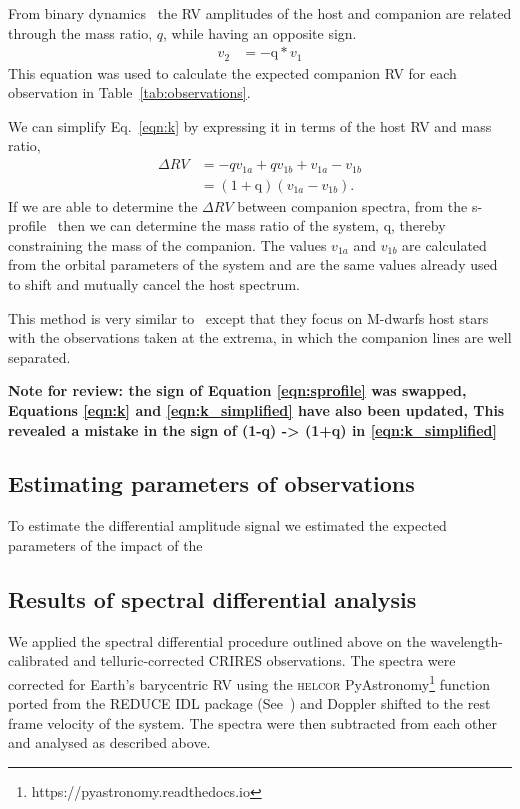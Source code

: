 \documentclass[fleqn,usenatbib]{mnras}
\begin{document}
    From binary dynamics~\citep[e.g.][]{murray_keplerian_2010} the RV amplitudes of the host and companion are related through the mass ratio, \(q\), while having an opposite sign.
    \begin{align}
    v_{2}  &= -\textrm{q} * v_{1} \label{eqn:q_relation}
    \end{align}
    This equation was used to calculate the expected companion RV for each observation in Table~\ref{tab:observations}.

    We can simplify Eq.~\ref{eqn:k} by expressing it in terms of the host RV and mass ratio,
    \begin{align}
    \Delta RV &= -q v_{1a} + q v_{1b} + v_{1a} - v_{1b} \nonumber \\
    &= (1 + \textrm{q})(v_{1a} - v_{1b}). \label{eqn:k_simplified}
    \end{align}
    If we are able to determine the \(\Delta RV\) between companion spectra,  from the s-profile~\citep[see ][]{ferluga_separating_1997} then we can determine the mass ratio of the system, q, thereby constraining the mass of the companion. The values \(v_{1a}\) and \(v_{1b}\) are calculated from the orbital parameters of the system and are the same values already used to shift and mutually cancel the host spectrum.

    This method is very similar to~\citet{kostogryz_spectral_2013} except that they focus on M-dwarfs host stars with the observations taken at the extrema, in which the companion lines are well separated.
    
    \textbf{Note for review: the sign of Equation \ref{eqn:sprofile} was swapped, Equations \ref{eqn:k} and \ref{eqn:k_simplified} have also been updated, This revealed a mistake in the sign of (1-q) -> (1+q) in  \ref{eqn:k_simplified}}
    
    \subsection{Estimating parameters of observations}
    To estimate the differential amplitude signal we estimated the expected parameters of the impact of the

    \subsection{Results of spectral differential analysis}
    \label{appendix:A2}
    We applied the spectral differential procedure outlined above on the wavelength-calibrated and telluric-corrected CRIRES observations. The spectra were corrected for Earth's barycentric RV using the \textsc{helcor} PyAstronomy\footnote{https://pyastronomy.readthedocs.io} function ported from the REDUCE IDL package (See~\citet[][]{piskunov_new_2002}) and Doppler shifted to the rest frame velocity of the system. The spectra were then subtracted from each other and analysed as described above.
\end{document}
